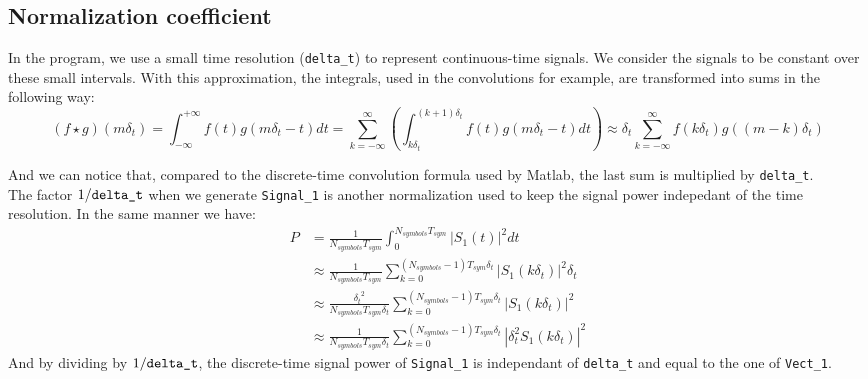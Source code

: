 \documentclass[a4paper]{article}
\begin{document}
\subsection{Normalization coefficient}
In the program, we use a small time resolution (\verb|delta_t|) to represent continuous-time signals. We consider the signals to be constant over these small intervals. With this approximation, the integrals, used in the convolutions for example, are transformed into sums in the following way:
\begin{equation*}
(f\star g)(m\delta_{t}) = \int_{-\infty}^{+\infty} f(t)g(m\delta_{t}-t) dt = \sum_{k=-\infty}^{\infty}\left(\int_{k\delta_{t}}^{(k+1)\delta_{t}} f(t)g(m\delta_{t}-t) dt \right) \approx \delta_{t}\sum_{k=-\infty}^{\infty}f(k\delta_{t})g((m-k)\delta_{t})
\end{equation*}

And we can notice that, compared to the discrete-time convolution formula used by Matlab, the last sum is multiplied by \verb|delta_t|.\\

The factor $1/\verb|delta_t|$ when we generate \verb|Signal_1| is another normalization used to keep the signal power indepedant of the time resolution. In the same manner we have:
\begin{align*}
P &=\frac{1}{N_{symbols}T_{sym}}\int_{0}^{N_{symbols}T_{sym}}|S_{1}(t)|^{2}dt\\
&\approx \frac{1}{N_{symbols}T_{sym}}\sum_{k=0}^{(N_{symbols}-1)T_{sym}\delta_t}|S_{1}(k\delta_t)|^{2}\delta_t\\ &\approx\frac{{\delta_t}^2}{N_{symbols}T_{sym}\delta_t}\sum_{k=0}^{(N_{symbols}-1)T_{sym}\delta_t}|S_{1}(k\delta_t)|^{2}\\
&\approx\frac{1}{N_{symbols}T_{sym}\delta_t}\sum_{k=0}^{(N_{symbols}-1)T_{sym}\delta_t}|\delta_t^2S_{1}(k\delta_t)|^{2} 
\end{align*}
And by dividing by $1/\verb|delta_t|$, the discrete-time signal power of \verb|Signal_1| is independant of \verb|delta_t| and equal to the one of \verb|Vect_1|.




\end{document}
